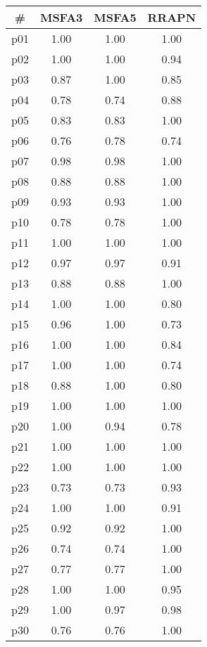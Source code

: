 \begin{tabular}{cccc}
\toprule
\textbf{\#} & \textbf{MSFA3} & \textbf{MSFA5} & \textbf{RRAPN}\\
\midrule
p01 & 1.00 & 1.00 & 1.00\\
p02 & 1.00 & 1.00 & 0.94\\
p03 & 0.87 & 1.00 & 0.85\\
p04 & 0.78 & 0.74 & 0.88\\
p05 & 0.83 & 0.83 & 1.00\\
p06 & 0.76 & 0.78 & 0.74\\
p07 & 0.98 & 0.98 & 1.00\\
p08 & 0.88 & 0.88 & 1.00\\
p09 & 0.93 & 0.93 & 1.00\\
p10 & 0.78 & 0.78 & 1.00\\
p11 & 1.00 & 1.00 & 1.00\\
p12 & 0.97 & 0.97 & 0.91\\
p13 & 0.88 & 0.88 & 1.00\\
p14 & 1.00 & 1.00 & 0.80\\
p15 & 0.96 & 1.00 & 0.73\\
p16 & 1.00 & 1.00 & 0.84\\
p17 & 1.00 & 1.00 & 0.74\\
p18 & 0.88 & 1.00 & 0.80\\
p19 & 1.00 & 1.00 & 1.00\\
p20 & 1.00 & 0.94 & 0.78\\
p21 & 1.00 & 1.00 & 1.00\\
p22 & 1.00 & 1.00 & 1.00\\
p23 & 0.73 & 0.73 & 0.93\\
p24 & 1.00 & 1.00 & 0.91\\
p25 & 0.92 & 0.92 & 1.00\\
p26 & 0.74 & 0.74 & 1.00\\
p27 & 0.77 & 0.77 & 1.00\\
p28 & 1.00 & 1.00 & 0.95\\
p29 & 1.00 & 0.97 & 0.98\\
p30 & 0.76 & 0.76 & 1.00\\
\bottomrule
\end{tabular}

